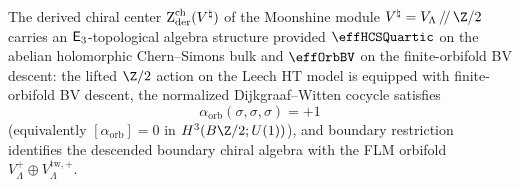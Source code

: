 \begin{theorem}
\label{thm:monster-orbifold-e3}
The derived chiral center $\operatorname{Z}_{\mathrm{der}}^{\mathrm{ch}}(V^\natural)$
of the Moonshine module
$V^\natural = V_\Lambda \,/\!/\, \Z/2$ carries an
$\mathsf{E}_3$-topological algebra structure provided $\effHCSQuartic$
on the abelian holomorphic Chern--Simons bulk and $\effOrbBV$ on the
finite-orbifold BV descent: the lifted
$\Z/2$ action on the Leech HT model is equipped with
finite-orbifold BV descent, the normalized Dijkgraaf--Witten
cocycle satisfies
\[
\alpha_{\mathrm{orb}}(\sigma,\sigma,\sigma)=+1
\]
\textup{(}equivalently
$[\alpha_{\mathrm{orb}}]=0$ in
$H^3(B\Z/2;U(1))$\textup{)}, and boundary restriction identifies
the descended boundary chiral algebra with the FLM orbifold
$V_\Lambda^+\oplus V_\Lambda^{\mathrm{tw},+}$.
\end{theorem}

